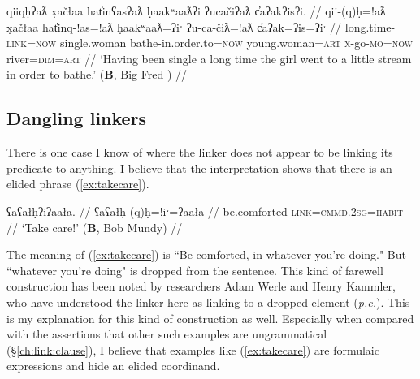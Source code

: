 \ex \label{ex:longtimesingle}
\begingl
\glpreamble qiiqḥʔaƛ x̣ačłaa hat̓inʕasʔaƛ ḥaakʷaaƛʔi ʔucačiʔaƛ c̓aʔakʔisʔi. //
\gla qii-(q)ḥ=!aƛ x̣ačłaa hat̓inq-!as=!aƛ ḥaakʷaaƛ=ʔiˑ ʔu-ca-čiƛ=!aƛ c̓aʔak=ʔis=ʔiˑ //
\glb long.time-\textsc{link}=\textsc{now} single.woman bathe-in.order.to=\textsc{now} young.woman=\textsc{art} \textsc{x}-go-\textsc{mo}=\textsc{now} river=\textsc{dim}=\textsc{art} //
\glft `Having been single a long time the girl went to a little stream in order to bathe.' (\textbf{B}, Big Fred \citet[p.~68]{sapir1939}) //
\endgl
\xe



\subsection{Dangling linkers} \label{ch:link:dangling}

There is one case I know of where the linker does not appear to be linking its predicate to anything. I believe that the interpretation shows that there is an elided phrase (\ref{ex:takecare}).

\ex \label{ex:takecare}
\begingl
\glpreamble ʕaʕałḥʔiʔaała. //
\gla ʕaʕałḥ-(q)ḥ=!iˑ=ʔaała //
\glb be.comforted-\textsc{link}=\textsc{cmmd.2sg}=\textsc{habit} //
\glft `Take care!' (\textbf{B}, Bob Mundy) //
\endgl
\xe

The meaning of (\ref{ex:takecare}) is ``Be comforted, in whatever you're doing." But ``whatever you're doing" is dropped from the sentence. This kind of farewell construction has been noted by researchers Adam Werle and Henry Kammler, who have understood the linker here as linking to a dropped element (\textit{p.c.}). This is my explanation for this kind of construction as well. Especially when compared with the assertions that other such examples are ungrammatical (\S\ref{ch:link:clause}), I believe that examples like (\ref{ex:takecare}) are formulaic expressions and hide an elided coordinand. %

